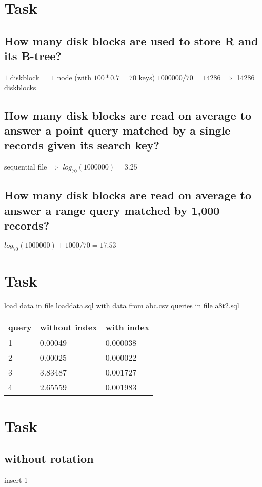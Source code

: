 \documentclass{article}
\begin{document}
\section{Task}
    \subsection{How many disk blocks are used to store R and its B-tree?}
        $1$ diskblock $= 1$ node (with $100*0.7 = 70$ keys) \newline
        $1000000 / 70 = 14286$
        $\Rightarrow$ 14286 diskblocks
    \subsection{How many disk blocks are read on average to answer a point query matched by a single records given its search key?}
        sequential file $\Rightarrow$  $log_{70}(1000000) = 3.25$
    \subsection{How many disk blocks are read on average to answer a range query matched by 1,000 records?}
        $log_{70}(1000000) + 1000/70 = 17.53$
\section{Task}
    load data in file loaddata.sql with data from abc.csv \newline
    queries in file a8t2.sql

    \begin{tabular}{l l l}
        query & without index & with index \\
        \hline
        1 & 0.00049 & 0.000038 \\
        2 & 0.00025 & 0.000022 \\
        3 & 3.83487 & 0.001727 \\
        4 & 2.65559 & 0.001983 \\
    \end{tabular}

\section{Task}
\subsection{without rotation}
    insert 1

\end{document}
